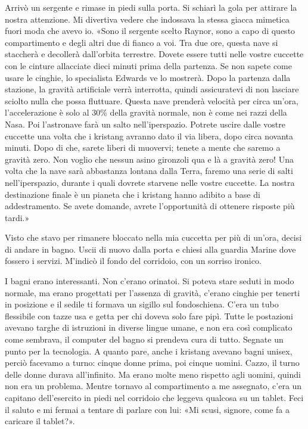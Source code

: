 Arrivò un sergente e rimase in piedi sulla porta. Si schiarì la gola per
attirare la nostra attenzione. Mi divertiva vedere che indossava la
stessa giacca mimetica fuori moda che avevo io. «Sono il sergente scelto
Raynor, sono a capo di questo compartimento e degli altri due di fianco
a voi. Tra due ore, questa nave si staccherà e decollerà dall'orbita
terrestre. Dovete essere tutti nelle vostre cuccette con le cinture
allacciate dieci minuti prima della partenza. Se non sapete come usare
le cinghie, lo specialista Edwards ve lo mostrerà. Dopo la partenza
dalla stazione, la gravità artificiale verrà interrotta, quindi
assicuratevi di non lasciare sciolto nulla che possa fluttuare. Questa
nave prenderà velocità per circa un'ora, l'accelerazione è solo al 30\%
della gravità normale, non è come nei razzi della Nasa. Poi l'astronave
farà un salto nell'iperspazio. Potrete uscire dalle vostre cuccette una
volta che i kristang avranno dato il via libera, dopo circa novanta
minuti. Dopo di che, sarete liberi di muovervi; tenete a mente che
saremo a gravità zero. Non voglio che nessun asino gironzoli qua e là a
gravità zero! Una volta che la nave sarà abbastanza lontana dalla Terra,
faremo una serie di salti nell'iperspazio, durante i quali dovrete
starvene nelle vostre cuccette. La nostra destinazione finale è un
pianeta che i kristang hanno adibito a base di addestramento. Se avete
domande, avrete l'opportunità di ottenere risposte più tardi.»

Visto che stavo per rimanere bloccato nella mia cuccetta per più di
un'ora, decisi di andare in bagno. Uscii di nuovo dalla porta e chiesi
alla guardia Marine dove fossero i servizi. M'indicò il fondo del
corridoio, con un sorriso ironico.

I bagni erano interessanti. Non c'erano orinatoi. Si poteva stare seduti
in modo normale, ma erano progettati per l'assenza di gravità, c'erano
cinghie per tenerti in posizione e il sedile ti formava un sigillo sul
fondoschiena. C'era un tubo flessibile con tazze usa e getta per chi
doveva solo fare pipì. Tutte le postazioni avevano targhe di istruzioni
in diverse lingue umane, e non era così complicato come sembrava, il
computer del bagno si prendeva cura di tutto. Segnate un punto per la
tecnologia. A quanto pare, anche i kristang avevano bagni unisex, perciò
facevamo a turno: cinque donne prima, poi cinque uomini. Cazzo, il turno
delle donne durava all'infinito. Ma erano molte meno rispetto agli
uomini, quindi non era un problema. Mentre tornavo al compartimento a me
assegnato, c'era un capitano dell'esercito in piedi nel corridoio che
leggeva qualcosa su un tablet. Feci il saluto e mi fermai a tentare di
parlare con lui: «Mi scusi, signore, come fa a caricare il tablet?».

